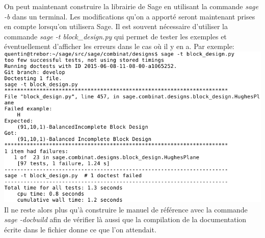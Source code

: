 \documentclass[a4paper]{article}
\begin{document}
On peut maintenant construire la librairie de Sage en utilisant la commande \textit{sage -b} dans un terminal. Les modifications qu'on a apporté seront maintenant prises en compte lorsqu'on utilisera Sage. Il est souvent nécessaire d'utiliser la commande \textit{sage -t block\_design.py} qui permet de tester les exemples et éventuellement d'afficher les erreurs dans le cas où il y en a. Par exemple:\vspace{1\baselineskip}\\
\includegraphics[scale=0.6]{hugheserror.png}\vspace{1\baselineskip}
Il ne reste alors plus qu'à construire le manuel de référence avec la commande \textit{sage -docbuild} afin de vérifier là aussi que la compilation de la documentation écrite dans le fichier donne ce que l'on attendait.



\newpage
\end{document}
